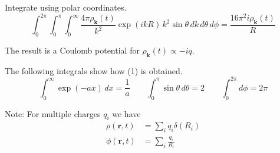 


Integrate using polar coordinates.
\begin{equation*}
\int_0^{2\pi}\int_0^\pi\int_0^\infty
\frac{4\pi\rho_{\mathbf k}(t)}{k^2}\exp(ikR)\,k^2\sin\theta\,dk\,d\theta\,d\phi
=\frac{16\pi^2i\rho_{\mathbf k}(t)}{R}
\tag{1}
\end{equation*}

The result is a Coulomb potential for
$\rho_{\mathbf k}(t)\propto -iq$.

\bigskip
The following integrals show how (1) is obtained.
\begin{equation*}
\int_0^\infty\exp(-a x)\,dx=\frac{1}{a}
\qquad
\int_0^\pi\sin\theta\,d\theta=2
\qquad
\int_0^{2\pi}d\phi=2\pi
\end{equation*}

Note: For multiple charges $q_i$ we have
\begin{align*}
\rho(\mathbf r,t)&=\sum_iq_i\delta(R_i)
\\
\phi(\mathbf r,t)&=\sum_i\frac{q_i}{R_i}
\end{align*}


